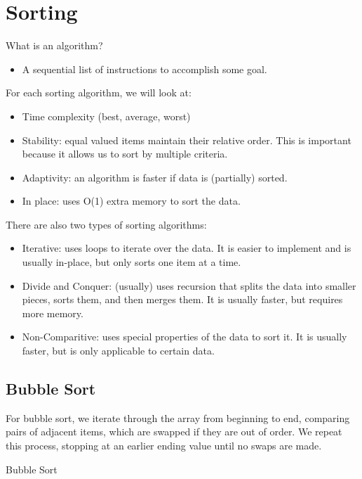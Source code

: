
\section{Sorting}
What is an algorithm?

\begin{itemize}
	\item A sequential list of instructions to accomplish some goal.
\end{itemize}

For each sorting algorithm, we will look at:
\begin{itemize}
	\item Time complexity (best, average, worst)
	\item Stability: equal valued items maintain their relative order. This is important because it allows us to sort by multiple criteria.
	\item Adaptivity: an algorithm is faster if data is (partially) sorted.
	\item In place: uses O(1) extra memory to sort the data.
\end{itemize}

There are also two types of sorting algorithms:
\begin{itemize}
	\item Iterative: uses loops to iterate over the data. It is easier to implement and is usually in-place, but only sorts one item at a time.
	\item Divide and Conquer: (usually) uses recursion that splits the data into smaller pieces, sorts them, and then merges them. It is usually faster, but requires more memory.
	\item Non-Comparitive: uses special properties of the data to sort it. It is usually faster, but is only applicable to certain data.
\end{itemize}

\subsection{Bubble Sort}

For bubble sort, we iterate through the array from beginning to end, comparing pairs of adjacent items, which are swapped if they are out of order. We repeat this process, stopping at an earlier ending value until no swaps are made.

\begin{algorithm}
	\caption{Bubble Sort}
\end{algorithm}

